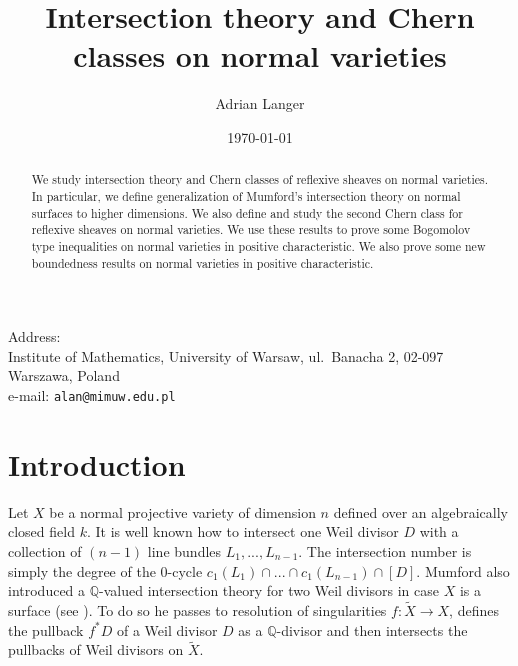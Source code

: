 \documentclass[twoside, 11pt]{article}
\theoremstyle{plain}
\theoremstyle{definition}
\theoremstyle{remark}
\newcommand{\QQ}{{\mathbb Q}}
\begin{document}
\markboth {\rm }{}



\title{Intersection theory and Chern classes on normal varieties}
\author{Adrian Langer} \date{\today}



\maketitle



{\noindent \sc Address:}\\
Institute of Mathematics, University of Warsaw,
ul.\ Banacha 2, 02-097 Warszawa, Poland\\
e-mail: {\tt alan@mimuw.edu.pl}


\medskip




\begin{abstract}
We study intersection theory and Chern classes of reflexive sheaves on normal varieties.
In particular, we define generalization of Mumford's intersection theory on normal surfaces to 
higher dimensions. We also define and study the second Chern class for reflexive sheaves on normal varieties. 
We use these results to prove some Bogomolov type inequalities on normal varieties in positive characteristic.
We also prove some new boundedness results  on normal varieties in positive characteristic.
\end{abstract}







\section*{Introduction}

Let $X$ be a normal projective variety of dimension $n$ defined over an algebraically closed field $k$.
It is well known how to intersect one Weil divisor $D$ with a collection of $(n-1)$ line bundles $L_1,...,L_{n-1}$.
The intersection number is simply the degree of the $0$-cycle $c_1(L_1)\cap ...\cap c_1(L_{n-1})\cap [D]$.
Mumford also  introduced a $\QQ$-valued intersection theory for two Weil divisors in case $X$ is a surface
(see \cite[Examples 7.1.16 and 8.3.11]{Fu}). To do so he passes to resolution of singularities $f: \tilde X\to X$, 
defines the pullback $f^*D$ of a Weil divisor $D$ as a $\QQ$-divisor and then intersects the pullbacks of Weil divisors on $\tilde X$. 
\end{document}
